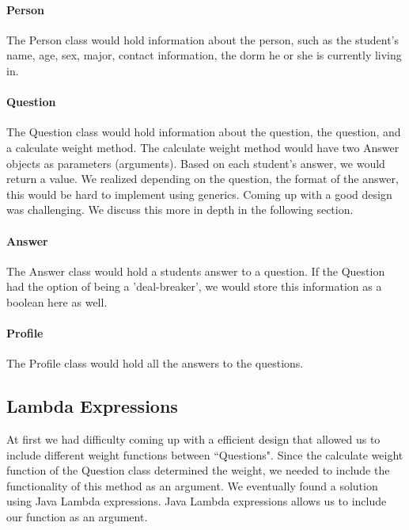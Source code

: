 \documentclass[12pt]{article}
\begin{document}
\paragraph{Person} The Person class would hold information about the person, such as the student's name, age, sex, major, contact information, the dorm he or she is currently living in.
\paragraph{Question}
The Question class would hold information about the question, the question, and a calculate weight method. The calculate weight method would have two Answer objects as parameters (arguments). Based on each student's answer, we would return a value. We realized depending on the question, the format of the answer, this would be hard to implement using generics. Coming up with a good design was challenging. We discuss this more in depth in the following section. 

\paragraph{Answer} The Answer class would hold a students answer to a question. If the Question had the option of being a 'deal-breaker', we would store this information as a boolean here as well.
\paragraph{Profile} The Profile class would hold all the answers to the questions.  

\subsection{Lambda Expressions}
At first we had difficulty coming up with a efficient design that allowed us to include different weight functions between ``Questions". Since the calculate weight function of the Question class determined the weight, we needed to include the functionality of this method as an argument. We eventually found a solution using Java Lambda expressions. Java Lambda expressions allows us to include our function as an argument. 


\end{document}
